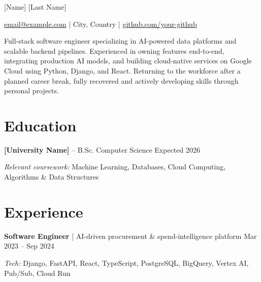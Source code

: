 \documentclass[11pt]{article}
\begin{document}

\centerline{\Huge [Name] [Last Name]}

\vspace{4pt}

\centerline{
\href{mailto:email@example.com}{email@example.com}
\;|\;
City, Country
\;|\;
\href{https://github.com/your-github}{github.com/your-github}
}
\vspace{4pt}


Full-stack software engineer specializing in AI-powered data platforms and scalable backend pipelines. Experienced in owning features end-to-end, integrating production AI models, and building cloud-native services on Google Cloud using Python, Django, and React. Returning to the workforce after a planned career break, fully recovered and actively developing skills through personal projects.

\vspace{-8pt}


\section*{Education}
\textbf{[University Name]} -- B.Sc. Computer Science \hfill Expected 2026

\textit{Relevant coursework:} Machine Learning, Databases, Cloud Computing, Algorithms \& Data Structures

\vspace{-8pt}


\section*{Experience}

\textbf{Software Engineer} | AI-driven procurement \& spend-intelligence platform
\hfill
Mar 2023 -- Sep 2024

\textit{Tech:} Django, FastAPI, React, TypeScript, PostgreSQL, BigQuery, Vertex AI, Pub/Sub, Cloud Run
\end{document}
